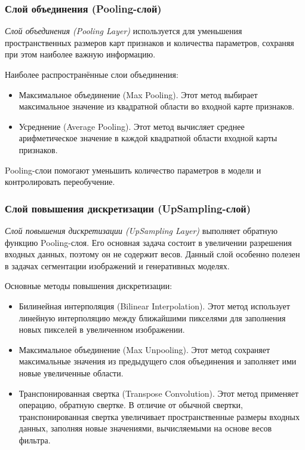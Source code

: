 \subsubsection{Слой объединения (Pooling-слой)}
\par \textit{Слой объединения (Pooling Layer)} используется для уменьшения пространственных размеров карт признаков и количества параметров, сохраняя при этом наиболее важную информацию. 
\par Наиболее распространённые слои объединения:
\begin{itemize}[]
	\item Максимальное объединение (Max Pooling). Этот метод выбирает максимальное значение из квадратной области во входной карте признаков. 
	\item Усреднение (Average Pooling). Этот метод вычисляет среднее арифметическое значение в каждой квадратной области входной карты признаков.
\end{itemize}
\par Pooling-слои помогают уменьшить количество параметров в модели и контролировать переобучение.

\subsubsection{Слой повышения дискретизации (UpSampling-слой)}
\par \textit{Слой повышения дискретизации (UpSampling Layer)} выполняет обратную функцию Pooling-слоя. Его основная задача состоит в увеличении разрешения входных данных, поэтому он не содержит весов. Данный слой особенно полезен в задачах сегментации изображений и генеративных моделях. 
\par Основные методы повышения дискретизации:
\begin{itemize}[]
	\item Билинейная интерполяция (Bilinear Interpolation). Этот метод использует линейную интерполяцию между ближайшими пикселями для заполнения новых пикселей в увеличенном изображении. 
	\item Максимальное объединение (Max Unpooling). Этот метод сохраняет максимальные значения из предыдущего слоя объединения и заполняет ими новые увеличенные области.
	\item Транспонированная свертка (Transpose Convolution). Этот метод применяет операцию, обратную свертке. В отличие от обычной свертки, транспонированная свертка увеличивает пространственные размеры входных данных, заполняя новые значениями, вычисляемыми на основе весов фильтра. 
\end{itemize} 

